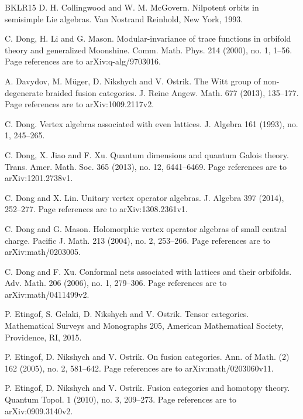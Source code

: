 \documentclass[leqno]{article}
\numberwithin{equation}{section}
\begin{document}
\begin{thebibliography}{BKLR15}
D. H. Collingwood and W. M. McGovern.
\newblock Nilpotent orbits in semisimple Lie algebras.
\newblock Van Nostrand Reinhold, New York, 1993.

C. Dong, H. Li and G. Mason.
\newblock Modular-invariance of trace functions in orbifold theory and generalized Moonshine.
\newblock Comm. Math. Phys. 214 (2000), no. 1, 1--56. Page references are to arXiv:q-alg/9703016.

A. Davydov, M. Müger, D. Nikshych and V. Ostrik.
\newblock The Witt group of non-degenerate braided fusion categories.
\newblock J. Reine Angew. Math. 677 (2013), 135--177. Page references are to arXiv:1009.2117v2.

C. Dong.
\newblock Vertex algebras associated with even lattices.
\newblock J. Algebra 161 (1993), no. 1, 245--265.

C. Dong, X. Jiao and F. Xu.
\newblock Quantum dimensions and quantum Galois theory.
\newblock Trans. Amer. Math. Soc. 365 (2013), no. 12, 6441--6469. Page references are to arXiv:1201.2738v1.

C. Dong and X. Lin.
\newblock Unitary vertex operator algebras.
\newblock J. Algebra 397 (2014), 252--277. Page references are to arXiv:1308.2361v1.

C. Dong and G. Mason.
\newblock Holomorphic vertex operator algebras of small central charge.
\newblock Pacific J. Math. 213 (2004), no. 2, 253--266. Page references are to arXiv:math/0203005.

C. Dong and F. Xu.
\newblock Conformal nets associated with lattices and their orbifolds.
\newblock Adv. Math. 206 (2006), no. 1, 279--306. Page references are to arXiv:math/0411499v2.

P. Etingof, S. Gelaki, D. Nikshych and V. Ostrik.
\newblock Tensor categories.
\newblock Mathematical Surveys and Monographs 205, American Mathematical Society, Providence, RI, 2015.

P. Etingof, D. Nikshych and V. Ostrik.
\newblock On fusion categories.
\newblock Ann. of Math. (2) 162 (2005), no. 2, 581--642. Page references are to arXiv:math/0203060v11.

P. Etingof, D. Nikshych and V. Ostrik.
\newblock Fusion categories and homotopy theory.
\newblock Quantum Topol. 1 (2010), no. 3, 209--273. Page references are to arXiv:0909.3140v2.


\end{thebibliography}
\end{document}
